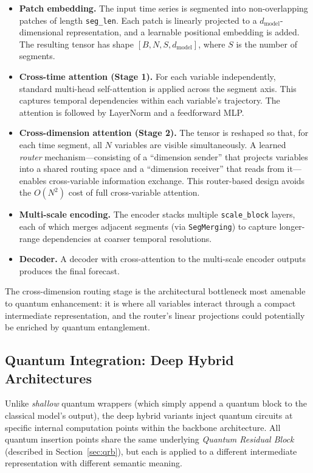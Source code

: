 \documentclass[11pt]{article}
\begin{document}
\begin{itemize}
  \item \textbf{Patch embedding.} The input time series is segmented into non-overlapping patches of length \texttt{seg\_len}. Each patch is linearly projected to a $d_\text{model}$-dimensional representation, and a learnable positional embedding is added. The resulting tensor has shape $[B, N, S, d_\text{model}]$, where $S$ is the number of segments.
  \item \textbf{Cross-time attention (Stage 1).} For each variable independently, standard multi-head self-attention is applied across the segment axis. This captures temporal dependencies within each variable's trajectory. The attention is followed by LayerNorm and a feedforward MLP.
  \item \textbf{Cross-dimension attention (Stage 2).} The tensor is reshaped so that, for each time segment, all $N$ variables are visible simultaneously. A learned \emph{router} mechanism---consisting of a ``dimension sender'' that projects variables into a shared routing space and a ``dimension receiver'' that reads from it---enables cross-variable information exchange. This router-based design avoids the $O(N^2)$ cost of full cross-variable attention.
  \item \textbf{Multi-scale encoding.} The encoder stacks multiple \texttt{scale\_block} layers, each of which merges adjacent segments (via \texttt{SegMerging}) to capture longer-range dependencies at coarser temporal resolutions.
  \item \textbf{Decoder.} A decoder with cross-attention to the multi-scale encoder outputs produces the final forecast.
\end{itemize}

The cross-dimension routing stage is the architectural bottleneck most amenable to quantum enhancement: it is where all variables interact through a compact intermediate representation, and the router's linear projections could potentially be enriched by quantum entanglement.

\subsection{Quantum Integration: Deep Hybrid Architectures}

Unlike \emph{shallow} quantum wrappers (which simply append a quantum block to the classical model's output), the deep hybrid variants inject quantum circuits at specific internal computation points within the backbone architecture. All quantum insertion points share the same underlying \emph{Quantum Residual Block} (described in Section~\ref{sec:qrb}), but each is applied to a different intermediate representation with different semantic meaning.
\end{document}
